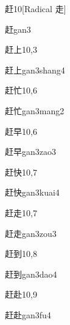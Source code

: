 \begin{entry}{赶}{10}[Radical ⾛]
  \begin{phonetics}{赶}{gan3}
  \end{phonetics}
\end{entry}

\begin{entry}{赶上}{10,3}
  \begin{phonetics}{赶上}{gan3shang4}
  \end{phonetics}
\end{entry}

\begin{entry}{赶忙}{10,6}
  \begin{phonetics}{赶忙}{gan3mang2}
  \end{phonetics}
\end{entry}

\begin{entry}{赶早}{10,6}
  \begin{phonetics}{赶早}{gan3zao3}
  \end{phonetics}
\end{entry}

\begin{entry}{赶快}{10,7}
  \begin{phonetics}{赶快}{gan3kuai4}
  \end{phonetics}
\end{entry}

\begin{entry}{赶走}{10,7}
  \begin{phonetics}{赶走}{gan3zou3}
  \end{phonetics}
\end{entry}

\begin{entry}{赶到}{10,8}
  \begin{phonetics}{赶到}{gan3dao4}
  \end{phonetics}
\end{entry}

\begin{entry}{赶赴}{10,9}
  \begin{phonetics}{赶赴}{gan3fu4}
  \end{phonetics}
\end{entry}

